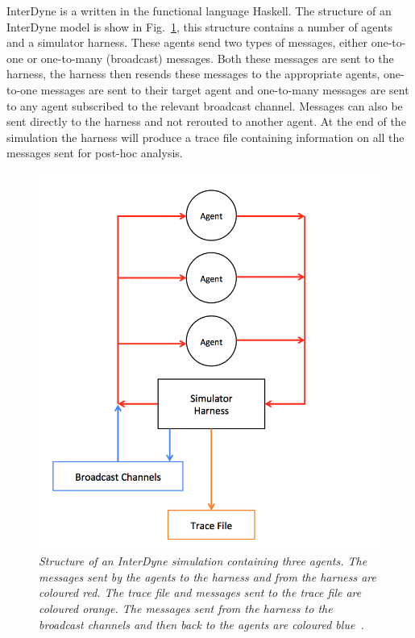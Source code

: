 \documentclass{article}
\begin{document}


InterDyne is a written in the functional language Haskell. The structure of an InterDyne model is show in Fig.~\ref{fig:harness_setupfigure}, this structure contains a number of agents and a simulator harness. These agents send two types of messages, either one-to-one or one-to-many (broadcast) messages. Both these messages are sent to the harness, the harness then resends these messages to the appropriate agents, one-to-one messages are sent to their target agent and one-to-many messages are sent to any agent subscribed to the relevant broadcast channel. Messages can also be sent directly to the harness and not rerouted to another agent. At the end of the simulation the harness will produce a trace file containing information on all the messages sent for post-hoc analysis.    
\begin{figure}[H]
	\centering
	\includegraphics[scale=0.5]{harness_setup}
	\caption{\it Structure of an InterDyne simulation containing three agents. The messages sent by the agents to the harness and from the harness are coloured red. The trace file and messages sent to the trace file are coloured orange. The messages sent from the harness to the broadcast channels and then back to the agents are coloured blue~\cite{interdynemanual}.}
	\label{fig:harness_setupfigure}
\end{figure} 
\end{document}
